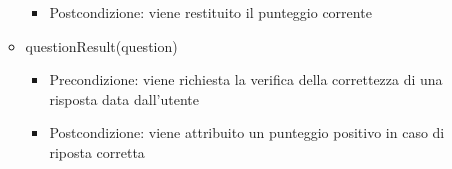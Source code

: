 \begin{itemize}
\begin{itemize}
\begin{itemize}
	\item{Postcondizione: viene restituito il punteggio corrente}
\end{itemize}
\item questionResult(question)
\begin{itemize}
	\item{Precondizione: viene richiesta la verifica della correttezza di una risposta data dall'utente}
	\item{Postcondizione: viene attribuito un punteggio positivo in caso di riposta corretta}
\end{itemize}
 	\end{itemize}
 \end{itemize}
